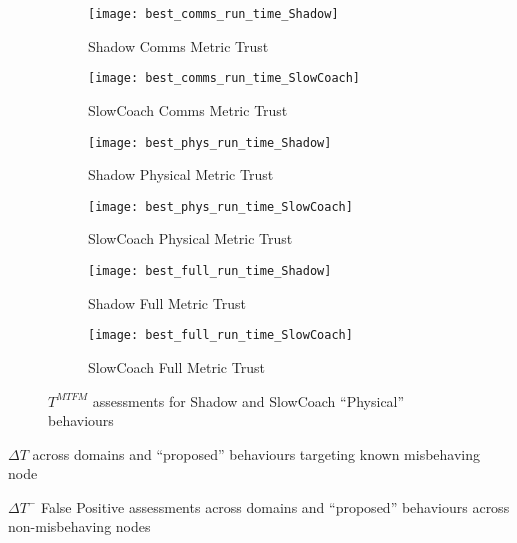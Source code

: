 \begin{figure}
	\begin{subfigure}[b]{0.5\textwidth}
		\centering
		\texttt{[image: best\_comms\_run\_time\_Shadow]}
		\caption{Shadow Comms Metric Trust}
		\label{fig:comms_time_shadow}
	\end{subfigure}
	\begin{subfigure}[b]{0.5\textwidth}
		\centering
		\texttt{[image: best\_comms\_run\_time\_SlowCoach]}
		\caption{SlowCoach Comms Metric Trust}
		\label{fig:comms_time_slowcoach}
	\end{subfigure}
	
	\begin{subfigure}[b]{0.5\textwidth}
		\centering
		\texttt{[image: best\_phys\_run\_time\_Shadow]}
		\caption{Shadow Physical Metric Trust }
		\label{fig:phys_time_shadow}
	\end{subfigure}
	\begin{subfigure}[b]{0.5\textwidth}
		\centering
		\texttt{[image: best\_phys\_run\_time\_SlowCoach]}
		\caption{SlowCoach Physical Metric Trust}
		\label{fig:phys_time_slowcoach}
	\end{subfigure}
		
	\begin{subfigure}[b]{0.5\textwidth}
		\centering
		\texttt{[image: best\_full\_run\_time\_Shadow]}
		\caption{Shadow Full Metric Trust }
		\label{fig:full_time_shadow}
	\end{subfigure}
	\begin{subfigure}[b]{0.5\textwidth}
		\centering
		\texttt{[image: best\_full\_run\_time\_SlowCoach]}
		\caption{SlowCoach Full Metric Trust}
		\label{fig:full_time_slowcoach}
	\end{subfigure}
	\caption{$T^{MTFM}$ assessments for Shadow and SlowCoach ``Physical'' behaviours}
	\label{fig:trust_shadow_slowcoach}
\end{figure}



	
\begin{table}
	\centering
	\caption{$\Delta T$ across domains and ``proposed'' behaviours targeting known misbehaving node}
	
	\label{tab:domain_deltas}
\end{table}

\begin{table}
	\centering
	\caption{$\Delta T^-$ False Positive assessments across domains and ``proposed'' behaviours across non-misbehaving nodes}
	
	\label{tab:domain_deltas_minus}
\end{table}

